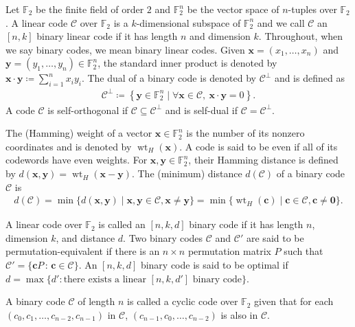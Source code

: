 \documentclass[12pt]{article}
\theoremstyle{definition}
\theoremstyle{plain}
\begin{document}
Let $\mathbb{F}_2$ be the finite field of order $2$ and $\mathbb{F}_{2}^{n}$ be the vector space of $n$-tuples over $\mathbb{F}_{2}$. A linear code $\mathcal{C}$ over  $\mathbb{F}_{2}$ is a $k$-dimensional subspace of $\mathbb{F}_{2}^{n}$ and we call $\mathcal{C}$ an $[n, k]$ binary linear code if it has length $n$ and dimension $k$. Throughout, when we say binary codes, we mean binary linear codes. Given $\mathbf{x} = (x_1 , \dotsc , x_n)$ and $\mathbf{y} = ( y_1 , \dotsc , y_n) \in \mathbb{F}_2^n$, the standard inner product is denoted by $ \mathbf{x} \cdot \mathbf{y}  \coloneqq \sum_{i=1}^{n}  x_i y _i$. The dual of a  binary code is denoted by $\mathcal{C}^{\perp}$ and is defined as
\begin{align*}
\mathcal{C}^{\perp} \coloneqq \left\{  \mathbf{y} \in \mathbb{F}_{2}^{n} \mid \forall \mathbf{x} \in \mathcal{C},  \  \mathbf{x}  \cdot \mathbf{y}  =  0 \right\}  .
\end{align*}
A code $\mathcal{C}$ is self-orthogonal if  $\mathcal{C} \subseteq \mathcal{C}^{\perp}$ and is self-dual if $\mathcal{C} = \mathcal{C}^{\perp}$.

The (Hamming) weight of a vector $\mathbf{x} \in \mathbb{F}_2^n$ is the number of its nonzero coordinates and is denoted by $\operatorname{wt}_H (\mathbf{x})$. A code is said to be even if all of its codewords have even weights. For $\mathbf{x}, \mathbf{y} \in \mathbb{F}_{2}^{n}$, their  Hamming distance is defined by $d(\mathbf{x}, \mathbf{y}) = \operatorname{wt}_H (\mathbf{x}-\mathbf{y})$. The (minimum) distance $d(\mathcal{C})$ of a binary code $\mathcal{C}$ is
\begin{align*}
d(\mathcal{C}) = \min \{d(\mathbf{x}, \mathbf{y}) \mid \mathbf{x}, \mathbf{y} \in \mathcal{C}, \mathbf{x} \neq \mathbf{y}\}=\min \{ \operatorname{wt}_H  (\mathbf{c}) \mid \mathbf{c} \in \mathcal{C}, \mathbf{c} \neq \mathbf{0}\}  .
\end{align*}

A  linear code over $\mathbb{F}_2$ is called an $[n, k, d]$ binary code if it has length $n$, dimension $k$, and distance $d$. Two binary codes $\mathcal{C}$ and $\mathcal{C}'$ are said to be permutation-equivalent if there is an $n \times n$ permutation matrix $P$ such that $\mathcal{C}' = \{ \mathbf{c} P \, : \, \mathbf{c} \in \mathcal{C}    \}$. An $[n, k, d]$ binary code is said to be optimal if $d = \max\{ d' \mathrel{:} \text{there exists a linear $[n, k , d']$ binary code}   \}$.


A binary code $\mathcal{C}$ of length $n$ is called a cyclic code over $\mathbb{F}_2$ given that for each $( c_0 , c_1 , \dotsc , c_{n-2} , c_{n-1} )$ in $\mathcal{C}$, $( c_{n-1} , c_0 , \dotsc , c_{n-2}  )$ is also in $\mathcal{C}$.
\end{document}
